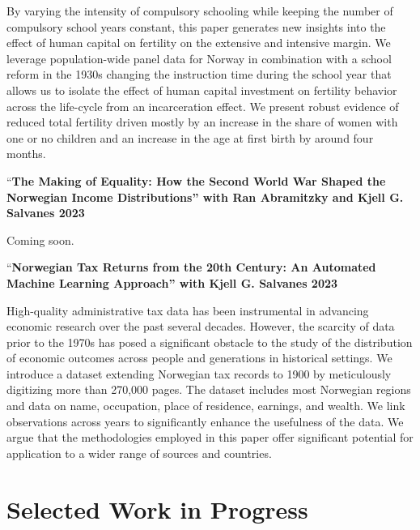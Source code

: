 \documentclass[11pt,]{article}
\begin{document}
By varying the intensity of compulsory schooling while keeping the
number of compulsory school years constant, this paper generates new
insights into the effect of human capital on fertility on the extensive
and intensive margin. We leverage population-wide panel data for Norway
in combination with a school reform in the 1930s changing the
instruction time during the school year that allows us to isolate the
effect of human capital investment on fertility behavior across the
life-cycle from an incarceration effect. We present robust evidence of
reduced total fertility driven mostly by an increase in the share of
women with one or no children and an increase in the age at first birth
by around four months.\vspace{0.3cm}\vspace{-0.2cm}

``\textbf{The Making of Equality: How the Second World War Shaped the
Norwegian Income Distributions'' with Ran Abramitzky and Kjell G.
Salvanes \hfill 2023}

Coming soon.\vspace{0.3cm}\vspace{-0.2cm}

``\textbf{Norwegian Tax Returns from the 20th Century: An Automated
Machine Learning Approach'' with Kjell G. Salvanes \hfill 2023}

High-quality administrative tax data has been instrumental in advancing
economic research over the past several decades. However, the scarcity
of data prior to the 1970s has posed a significant obstacle to the study
of the distribution of economic outcomes across people and generations
in historical settings. We introduce a dataset extending Norwegian tax
records to 1900 by meticulously digitizing more than 270,000 pages. The
dataset includes most Norwegian regions and data on name, occupation,
place of residence, earnings, and wealth. We link observations across
years to significantly enhance the usefulness of the data. We argue that
the methodologies employed in this paper offer significant potential for
application to a wider range of sources and
countries.\vspace{0.3cm}\vspace{-0.2cm}

\vspace{0.5cm}

\hypertarget{selected-work-in-progress}{%
\section{Selected Work in Progress}\label{selected-work-in-progress}}
\end{document}
